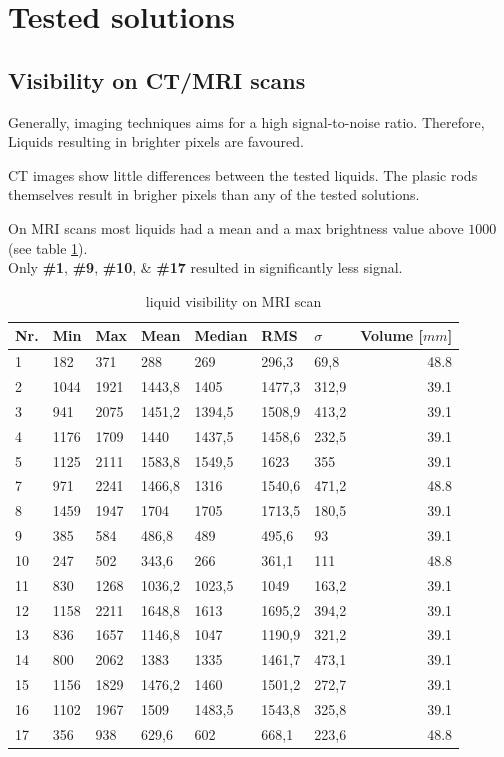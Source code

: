 \documentclass[parskip,bibtotoc,final,twoside=false,titlepage,a4paper,english,12pt,titlepage,a4paper]{scrbook}
\begin{document}
\section{Tested solutions}

\subsection{Visibility on CT/MRI scans}

Generally, imaging techniques aims for a high signal-to-noise ratio.
Therefore, Liquids resulting in brighter pixels are favoured.

CT images show little differences between the tested liquids. The plasic rods themselves result in brigher pixels than any of the tested solutions.

On MRI scans most liquids had a mean and a max brightness value above $1000$ (see table \ref{tab:visibility}).\\
Only \textbf{\#1}, \textbf{\#9}, \textbf{\#10}, \& \textbf{\#17} resulted in significantly less signal.


\begin{table}[]
\centering
\begin{tabular}{@{}lllllllr@{}}
\toprule
Nr. & Min  & Max  & Mean   & Median & RMS    & $\sigma$     & Volume [$mm$] \\ \midrule
1   & 182  & 371  & 288    & 269    & 296,3  & 69,8  & 48.8 \\
2   & 1044 & 1921 & 1443,8 & 1405   & 1477,3 & 312,9 & 39.1 \\
3   & 941  & 2075 & 1451,2 & 1394,5 & 1508,9 & 413,2 & 39.1 \\
4   & 1176 & 1709 & 1440   & 1437,5 & 1458,6 & 232,5 & 39.1 \\
5   & 1125 & 2111 & 1583,8 & 1549,5 & 1623   & 355   & 39.1 \\
7   & 971  & 2241 & 1466,8 & 1316   & 1540,6 & 471,2 & 48.8 \\
8   & 1459 & 1947 & 1704   & 1705   & 1713,5 & 180,5 & 39.1 \\
9   & 385  & 584  & 486,8  & 489    & 495,6  & 93    & 39.1 \\
10  & 247  & 502  & 343,6  & 266    & 361,1  & 111   & 48.8 \\
11  & 830  & 1268 & 1036,2 & 1023,5 & 1049   & 163,2 & 39.1 \\
12  & 1158 & 2211 & 1648,8 & 1613   & 1695,2 & 394,2 & 39.1 \\
13  & 836  & 1657 & 1146,8 & 1047   & 1190,9 & 321,2 & 39.1 \\
14  & 800  & 2062 & 1383   & 1335   & 1461,7 & 473,1 & 39.1 \\
15  & 1156 & 1829 & 1476,2 & 1460   & 1501,2 & 272,7 & 39.1 \\
16  & 1102 & 1967 & 1509   & 1483,5 & 1543,8 & 325,8 & 39.1 \\
17  & 356  & 938  & 629,6  & 602    & 668,1  & 223,6 & 48.8 \\ \bottomrule
\end{tabular}
\caption{liquid visibility on MRI scan}
\label{tab:visibility}
\end{table}
\end{document}
